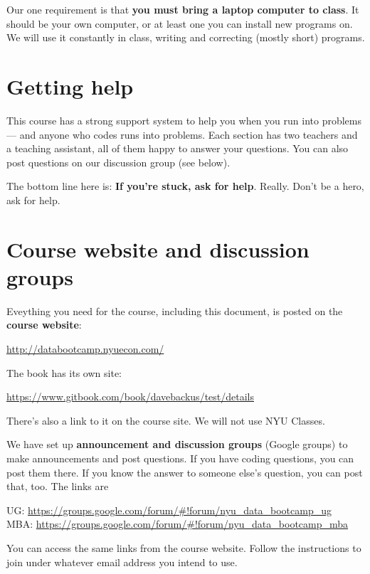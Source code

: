 \documentclass[11pt]{article}
\begin{document}
Our one requirement is that {\bf you must bring a laptop computer to class\/}.
It should be your own computer, or at least one you can install new programs on.
We will use it constantly in class, writing and correcting (mostly short) programs.


\section*{Getting help}



This course has a strong support system to help you when you run into problems ---
and anyone who codes runs into problems.
Each section has two teachers and a teaching assistant, all of them happy to answer your questions.
You  can also post questions on our discussion group (see below).

The bottom line here is:  {\bf If you're stuck, ask for help\/}.
Really.  Don't be a hero, ask for help.



\section*{Course website and discussion groups}

Eveything you need for the course, including this document, is posted on
the {\bf course website\/}:
%
\vspace{-0.15in}
\begin{center}
\url{http://databootcamp.nyuecon.com/}
\end{center}
\vspace{-0.15in}
%
The book has its own site:  
%
\vspace{-0.15in}
\begin{center}
\url{https://www.gitbook.com/book/davebackus/test/details}  
\end{center}
\vspace{-0.15in}
%
There's also a link to it on the course site.  
We will not use NYU Classes.

We have set up {\bf announcement and discussion groups\/} (Google groups)
to make announcements and post questions.
If you have coding questions, you can post them there.
If you know the answer to someone else's question, you can post that, too.
The links are
%
\vspace{-0.1in}
\begin{center}
UG:   \url{https://groups.google.com/forum/#!forum/nyu_data_bootcamp_ug}  \\
MBA:  \url{https://groups.google.com/forum/#!forum/nyu_data_bootcamp_mba}
\end{center}
\vspace{-0.1in}
%
You can access the same links from the course website.  Follow the instructions to join under whatever email address you intend to use.
\end{document}
